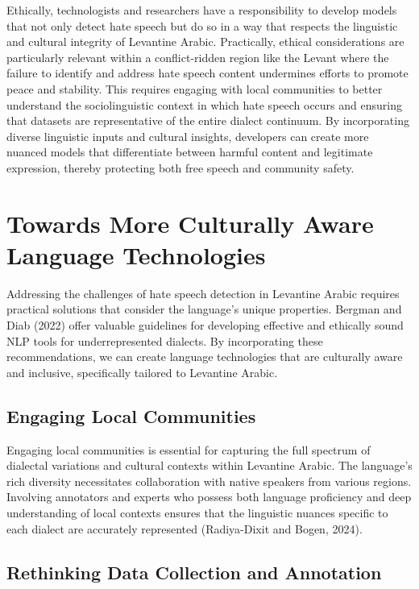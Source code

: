 \documentclass[11pt]{article}
\begin{document}
Ethically, technologists and researchers have a responsibility to develop models that not only detect hate speech but do so in a way that respects the linguistic and cultural integrity of Levantine Arabic. Practically, ethical considerations are particularly relevant within a conflict-ridden region like the Levant where the failure to identify and address hate speech content undermines efforts to promote peace and stability. This requires engaging with local communities to better understand the sociolinguistic context in which hate speech occurs and ensuring that datasets are representative of the entire dialect continuum. By incorporating diverse linguistic inputs and cultural insights, developers can create more nuanced models that differentiate between harmful content and legitimate expression, thereby protecting both free speech and community safety.


\section{Towards More Culturally Aware Language Technologies}

Addressing the challenges of hate speech detection in Levantine Arabic requires practical solutions that consider the language's unique properties. Bergman and Diab (2022) offer valuable guidelines for developing effective and ethically sound NLP tools for underrepresented dialects. By incorporating these recommendations, we can create language technologies that are culturally aware and inclusive, specifically tailored to Levantine Arabic.


\subsection{Engaging Local Communities}

Engaging local communities is essential for capturing the full spectrum of dialectal variations and cultural contexts within Levantine Arabic. The language's rich diversity necessitates collaboration with native speakers from various regions. Involving annotators and experts who possess both language proficiency and deep understanding of local contexts ensures that the linguistic nuances specific to each dialect are accurately represented (Radiya-Dixit and Bogen, 2024).


\subsection{Rethinking Data Collection and Annotation}
\end{document}
